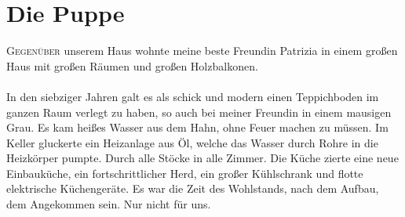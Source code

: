 \chapter{Die Puppe}
\lettrine{G}{egenüber} unserem Haus wohnte meine beste Freundin Patrizia in einem großen Haus mit großen Räumen und großen Holzbalkonen.\\\\
In den siebziger Jahren galt es als schick und modern einen Teppichboden im ganzen Raum verlegt zu haben, so auch bei meiner Freundin in einem mausigen Grau. Es kam heißes Wasser aus dem Hahn, ohne Feuer machen zu müssen. Im Keller gluckerte ein Heizanlage aus Öl, welche das Wasser durch Rohre in die Heizkörper pumpte. Durch alle Stöcke in alle Zimmer. Die Küche zierte eine neue Einbauküche, ein fortschrittlicher Herd, ein großer Kühlschrank und flotte elektrische Küchengeräte. Es war die Zeit des Wohlstands, nach dem Aufbau, dem Angekommen sein. Nur nicht für uns.\\\\
